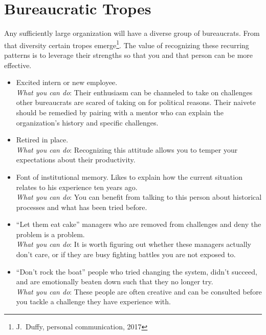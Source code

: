 \section{Bureaucratic Tropes\label{sec:tropes}}

Any sufficiently large organization will have a diverse group of bureaucrats. From that diversity certain tropes emerge\footnote{J.~Duffy, personal communication, 2017}. The value of recognizing these recurring patterns is to leverage their strengths so that you and that person can be more effective. 

\begin{itemize}
    \item Excited intern or new employee. \\
    \textit{What you can do}: Their enthusiasm can be channeled to take on challenges other bureaucrats are scared of taking on for political reasons. Their naivete should be remedied by pairing with a mentor who can explain the organization's history and specific challenges.
    
    \item Retired in place. \\
    \textit{What you can do}: Recognizing this attitude allows you to temper your expectations about their productivity. 
    
    \item Font of institutional memory. Likes to explain how the current situation relates to his experience ten years ago. \\
    \textit{What you can do}: You can benefit from talking to this person about historical processes and what has been tried before. 
    
    \item ``Let them eat cake'' managers who are removed from challenges and deny the problem is a problem. \\
    \textit{What you can do}: It is worth figuring out whether these managers actually don't care, or if they are busy fighting battles you are not exposed to.
    
    \item ``Don't rock the boat'' people who tried changing the system, didn't succeed, and are emotionally beaten down such that they no longer try. \\
    \textit{What you can do}: These people are often creative and can be consulted before you tackle a challenge they have experience with. 
    

\end{itemize}
